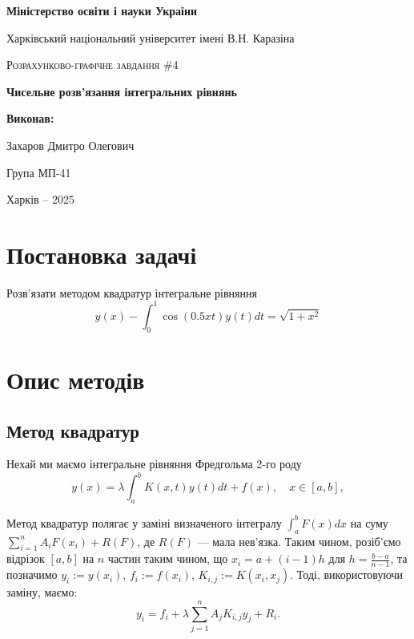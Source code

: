 \documentclass[14pt]{extarticle}
\begin{document}
\begin{titlepage}
	\centering
	{\textbf{Міністерство освіти і науки України}\par
 Харківський національний університет імені В.Н. Каразіна\par}
    \vspace{1cm}
	{\Large \textsc{Розрахунково-графічне завдання \#4}\par
    \textbf{Чисельне розв'язання інтегральних рівнянь}\par}
	\vfill
 \begin{FlushRight}
	\textbf{Виконав:}\par Захаров Дмитро Олегович \par Група МП-41
\end{FlushRight}
	\vfill

	{\large Харків -- 2025\par}
\end{titlepage}

\tableofcontents
\pagebreak

\section{Постановка задачі}

Розв'язати методом квадратур інтегральне рівняння
\begin{equation*}
    y(x) - \int_0^1 \cos (0.5 xt)y(t)dt = \sqrt{1+x^2}
\end{equation*}

\section{Опис методів}

\subsection{Метод квадратур}

Нехай ми маємо інтегральне рівняння Фредгольма 2-го роду
\begin{equation*}
    y(x) = \lambda\int_a^b K(x,t)y(t)dt + f(x), \quad x \in [a,b],
\end{equation*}

Метод квадратур полягає у заміні визначеного інтегралу $\int_a^b F(x)dx$ на суму
$\sum_{i=1}^n A_iF(x_i) + R(F)$, де $R(F)$ --- мала нев'язка. Таким чином,
розіб'ємо відрізок $[a,b]$ на $n$ частин таким чином, що $x_i=a+(i-1)h$ для
$h=\frac{b-a}{n-1}$, та позначимо $y_i := y(x_i)$, $f_i := f(x_i)$, $K_{i,j} :=
K(x_i,x_j)$. Тоді, використовуючи заміну, маємо:
\begin{equation*}
    y_i = f_i + \lambda \sum_{j=1}^n A_jK_{i,j}y_j + R_i.
\end{equation*}
\end{document}
